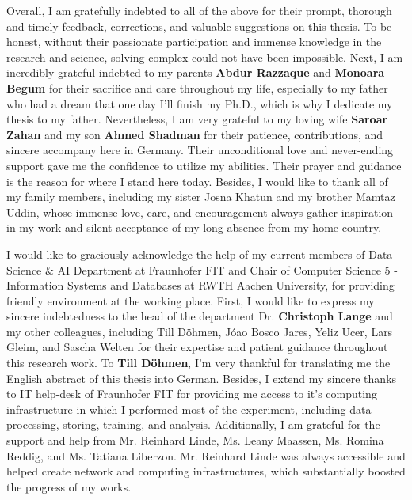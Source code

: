 \begin{acknowledgements}
    \hspace*{5mm} Overall, I am gratefully indebted to all of the above for their prompt, thorough and timely feedback, corrections, and valuable suggestions on this thesis. To be honest, without their passionate participation and immense knowledge in the research and science, solving complex could not have been impossible. Next, I am incredibly grateful indebted to my parents \textbf{Abdur Razzaque} and \textbf{Monoara Begum} for their sacrifice and care throughout my life, especially to my father who had a dream that one day I'll finish my Ph.D., which is why I dedicate my thesis to my father. Nevertheless, I am very grateful to my loving wife \textbf{Saroar Zahan} and my son \textbf{Ahmed Shadman} for their patience, contributions, and sincere accompany here in Germany. Their unconditional love and never-ending support gave me the confidence to utilize my abilities. Their prayer and guidance is the reason for where I stand here today. Besides, I would like to thank all of my family members, including my sister Josna Khatun and my brother Mamtaz Uddin, whose immense love, care, and encouragement always gather inspiration in my work and silent acceptance of my long absence from my home country. 
    
    \hspace*{5mm} I would like to graciously acknowledge the help of my current members of Data Science \& AI Department at Fraunhofer FIT and Chair of Computer Science 5 - Information Systems and Databases at RWTH Aachen University, for providing friendly environment at the working place. First, I would like to express my sincere indebtedness to the head of the department Dr. \textbf{Christoph Lange} and my other colleagues, including Till D{\"o}hmen, J{\'o}ao Bosco Jares, Yeliz Ucer, Lars Gleim, and Sascha Welten for their expertise and patient guidance throughout this research work. To \textbf{Till D{\"o}hmen}, I'm very thankful for translating me the English abstract of this thesis into German. Besides, I extend my sincere thanks to IT help-desk of Fraunhofer FIT for providing me access to it's computing infrastructure in which I performed most of the experiment, including data processing, storing, training, and analysis. Additionally, I am grateful for the support and help from Mr. Reinhard Linde, Ms. Leany Maassen, Ms. Romina Reddig, and Ms. Tatiana Liberzon. Mr. Reinhard Linde was always accessible and helped create network and computing infrastructures, which substantially boosted the progress of my works. 
    

\end{acknowledgements}
